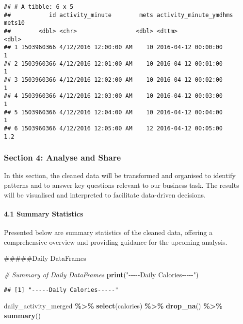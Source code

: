 \documentclass[
]{article}
\newenvironment{Shaded}{\begin{snugshade}}{\end{snugshade}}
\newcommand{\CommentTok}[1]{\textcolor[rgb]{0.56,0.35,0.01}{\textit{#1}}}
\newcommand{\FunctionTok}[1]{\textcolor[rgb]{0.13,0.29,0.53}{\textbf{#1}}}
\newcommand{\NormalTok}[1]{#1}
\newcommand{\SpecialCharTok}[1]{\textcolor[rgb]{0.81,0.36,0.00}{\textbf{#1}}}
\newcommand{\StringTok}[1]{\textcolor[rgb]{0.31,0.60,0.02}{#1}}
\begin{document}
\begin{verbatim}
## # A tibble: 6 x 5
##           id activity_minute        mets activity_minute_ymdhms mets10
##        <dbl> <chr>                 <dbl> <dttm>                  <dbl>
## 1 1503960366 4/12/2016 12:00:00 AM    10 2016-04-12 00:00:00       1  
## 2 1503960366 4/12/2016 12:01:00 AM    10 2016-04-12 00:01:00       1  
## 3 1503960366 4/12/2016 12:02:00 AM    10 2016-04-12 00:02:00       1  
## 4 1503960366 4/12/2016 12:03:00 AM    10 2016-04-12 00:03:00       1  
## 5 1503960366 4/12/2016 12:04:00 AM    10 2016-04-12 00:04:00       1  
## 6 1503960366 4/12/2016 12:05:00 AM    12 2016-04-12 00:05:00       1.2
\end{verbatim}

\hypertarget{section-4-analyse-and-share}{%
\subsubsection{Section 4: Analyse and
Share}\label{section-4-analyse-and-share}}

In this section, the cleaned data will be transformed and organised to
identify patterns and to answer key questions relevant to our business
task. The results will be visualised and interpreted to facilitate
data-driven decisions.

\hypertarget{summary-statistics}{%
\paragraph{4.1 Summary Statistics}\label{summary-statistics}}

Presented below are summary statistics of the cleaned data, offering a
comprehensive overview and providing guidance for the upcoming analysis.

\#\#\#\#\#Daily DataFrames

\begin{Shaded}
\begin{Highlighting}[]
\CommentTok{\# Summary of Daily DataFrames}
\FunctionTok{print}\NormalTok{(}\StringTok{"{-}{-}{-}{-}{-}Daily Calories{-}{-}{-}{-}{-}"}\NormalTok{)}
\end{Highlighting}
\end{Shaded}

\begin{verbatim}
## [1] "-----Daily Calories-----"
\end{verbatim}

\begin{Shaded}
\begin{Highlighting}[]
\NormalTok{daily\_activity\_merged }\SpecialCharTok{\%\textgreater{}\%} 
  \FunctionTok{select}\NormalTok{(calories) }\SpecialCharTok{\%\textgreater{}\%} 
  \FunctionTok{drop\_na}\NormalTok{() }\SpecialCharTok{\%\textgreater{}\%} 
  \FunctionTok{summary}\NormalTok{()}
\end{Highlighting}
\end{Shaded}
\end{document}
